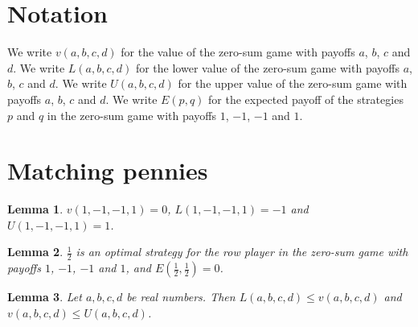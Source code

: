 \documentclass{article}
\newtheorem{lemma}{Lemma}
\begin{document}
\section{Notation}

We write $v(a,b,c,d)$ for the value of the zero-sum game with payoffs $a$, $b$, $c$ and $d$.
We write $L(a,b,c,d)$ for the lower value of the zero-sum game with payoffs $a$, $b$, $c$ and $d$.
We write $U(a,b,c,d)$ for the upper value of the zero-sum game with payoffs $a$, $b$, $c$ and $d$.
We write $E(p,q)$ for the expected payoff of the strategies $p$ and $q$ in the zero-sum game with payoffs $1$, $-1$, $-1$ and $1$.

\section{Matching pennies}

\begin{lemma}\label{pennies}
$v(1,-1,-1,1)=0$, $L(1,-1,-1,1)=-1$ and $U(1,-1,-1,1)=1$.
\end{lemma}

\begin{lemma}\label{optimal}
$\frac12$ is an optimal strategy for the row player in the zero-sum game with payoffs $1$, $-1$, $-1$ and $1$, and $E(\frac12,\frac12)=0$.
\end{lemma}

\begin{lemma}\label{minimax}
Let $a,b,c,d$ be real numbers. Then $L(a,b,c,d)\le v(a,b,c,d)$ and $v(a,b,c,d)\le U(a,b,c,d)$.
\end{lemma}
\end{document}
